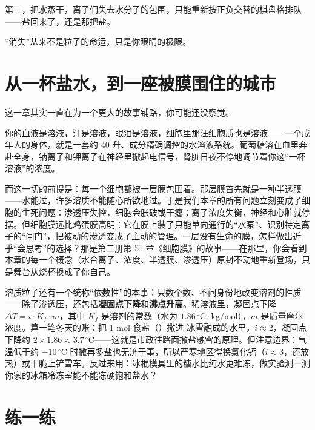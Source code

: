 第三，把水蒸干，离子们失去水分子的包围，只能重新按正负交替的棋盘格排队——盐回来了，还是那把盐。

“消失”从来不是粒子的命运，只是你眼睛的极限。

\section{从一杯盐水，到一座被膜围住的城市}

这一章其实一直在为一个更大的故事铺路，你可能还没察觉。

你的血液是溶液，汗是溶液，眼泪是溶液，细胞里那汪细胞质也是溶液——一个成年人的身体，就是一套约 40 升、成分精确调控的水溶液系统。葡萄糖溶在血里奔赴全身，钠离子和钾离子在神经里掀起电信号，肾脏日夜不停地调节着你这“一杯溶液”的浓度。

而这一切的前提是：每一个细胞都被一层膜包围着。那层膜首先就是一种半透膜——水能过，许多溶质不能随心所欲地过。于是我们本章的所有问题立刻变成了细胞的生死问题：渗透压失控，细胞会胀破或干瘪；离子浓度失衡，神经和心脏就停摆。但细胞膜远比鸡蛋膜高明：它在膜上装了只能单向通行的“水泵”、识别特定离子的“闸门”，把被动的渗透变成了主动的管理。一层没有生命的膜，怎样做出近乎“会思考”的选择？那是第二册第 51 章《细胞膜》的故事——在那里，你会看到本章的每一个概念（水合离子、浓度、半透膜、渗透压）原封不动地重新登场，只是舞台从烧杯换成了你自己。

\begin{tiaozhan}
溶质粒子还有一个统称“依数性”的本事：只数个数、不问身份地改变溶剂的性质——除了渗透压，还包括\textbf{凝固点下降}和\textbf{沸点升高}。稀溶液里，凝固点下降 $\Delta T = i\cdot K_f\cdot m$，其中 $K_f$ 是溶剂的常数（水为 $1.86\,^{\circ}\mathrm{C\cdot kg/mol}$），$m$ 是质量摩尔浓度。算一笔冬天的账：把 1 mol 食盐（）撒进  冰雪融成的水里，$i\approx 2$，凝固点下降约 $2\times 1.86\approx 3.7\,^{\circ}\mathrm{C}$——这就是市政往路面撒盐融雪的原理。但注意边界：气温低于约 $-10\,^{\circ}\mathrm{C}$ 时撒再多盐也无济于事，所以严寒地区得换氯化钙（$i\approx 3$，还放热）或干脆上铲雪车。反过来用：冰棍模具里的糖水比纯水更难冻，做实验测一测你家的冰箱冷冻室能不能冻硬饱和盐水？
\end{tiaozhan}

\section*{练一练}

